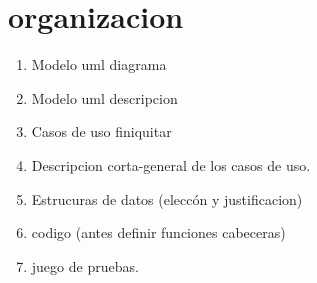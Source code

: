 \documentclass[../main.tex]{subfiles}
\begin{document}
\section{organizacion}
\begin{enumerate}

    \item Modelo uml diagrama
    \item Modelo uml descripcion
    
    \item Casos de uso finiquitar
    \item Descripcion corta-general de los casos de uso.
    
    \item Estrucuras de datos (eleccón y justificacion)
    
    \hline
    \item codigo (antes definir funciones cabeceras)
    \item juego de pruebas.
\end{enumerate}
\end{document}
